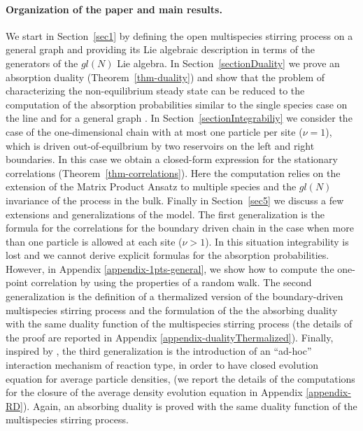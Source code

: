 \documentclass[10pt]{article}
\numberwithin{equation}{section}
\numberwithin{equation}{subsection}
\newcommand{\fra}[1]{\textcolor[rgb]{0,0,1}{#1}}
\begin{document}
\paragraph{Organization of the paper and main results.}
We start in Section~\ref{sec1} by \fra{defining} the open multispecies stirring
process on a general graph and providing its Lie algebraic description in terms of the generators of the $gl(N)$ Lie algebra. In Section~\ref{sectionDuality} we prove an absorption duality (Theorem~\ref{thm-duality})
and show that the problem of characterizing the non-equilibrium
steady state can be reduced to the computation of the absorption probabilities similar to the single species case on the line  \cite{KMP} and for a general graph \cite{ frassek2020duality}.  
In Section~\ref{sectionIntegrabiliy}  we consider  the case of the one-dimensional chain with at most one 
particle per site ($\nu=1$), which is driven out-of-equilbrium by two reservoirs on the left and right boundaries. In this case we obtain a closed-form expression for the stationary correlations (Theorem~\ref{thm-correlations}). Here the computation
relies on the extension of the  Matrix Product Ansatz \cite{derrida1993exact} to multiple species \cite{vanicat2017exact} and the $gl(N)$ invariance of the process in the bulk. Finally in Section~\ref{sec5} we discuss a few extensions 
and generalizations of the model. 
The first generalization is the formula for the correlations for the boundary driven chain in the case when more than one particle is allowed at each site ($\nu > 1$). 
In this situation integrability is lost and we cannot derive explicit formulas for the absorption probabilities. However, in Appendix \ref{appendix-1pts-general}, we show how to compute the one-point correlation by using the properties of a random walk. The second generalization is the definition of a thermalized version of the boundary-driven multispecies stirring process and the formulation of the the absorbing duality with the same duality function of the multispecies stirring process (the details of the proof are reported in Appendix \ref{appendix-dualityThermalized}). \fra{Finally, inspired by \cite{casini2022uphill,schutzReaction},} the third generalization is the introduction of an ``ad-hoc'' interaction mechanism of reaction type, in order to have closed evolution equation for average particle densities, \fra{(we report the details of the computations for the closure of the average density evolution equation in Appendix \ref{appendix-RD})}. 
Again, an absorbing duality is proved with the same duality function of the multispecies stirring process.   
\end{document}
